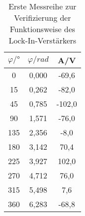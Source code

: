 \begin{table}[h!]
  \centering
  \caption{Erste Messreihe zur Verifizierung der Funktionsweise des Lock-In-Verstärkers}
  \label{tab:normal}
  \begin{tabular}{c c c}
    \toprule
     $\varphi/°$ & $\varphi/rad$ &	 A/V	   \\
    \midrule
    0   & 0,000  & -69,6  \\
    15  & 0,262	& -82,0  \\
    45  & 0,785	& -102,0 \\
    90  & 1,571	& -76,0  \\
    135 & 2,356	& -8,0   \\
    180 & 3,142	&  70,4  \\
    225 & 3,927	&  102,0 \\
    270 & 4,712	&  76,0  \\
    315 & 5,498	&  7,6   \\
    360 & 6,283	& -68,8  \\
    \bottomrule
  \end{tabular}
\end{table}
